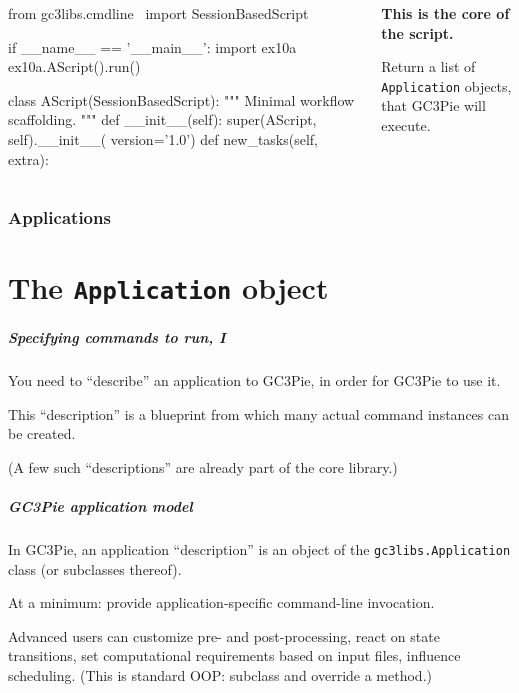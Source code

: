 \documentclass[english,serif,mathserif,xcolor=pdftex,dvipsnames,table]{beamer}
\begin{document}
\begin{frame}[fragile]
  \begin{columns}
    \begin{column}{0.7\linewidth}
\begin{python}
from gc3libs.cmdline \
  import SessionBasedScript

if __name__ == '__main__':
  import ex10a
  ex10a.AScript().run()

class AScript(SessionBasedScript):
  """
  Minimal workflow scaffolding.
  """
  def __init__(self):
    super(AScript, self).__init__(
        version='1.0')
  def new_tasks(self, extra):
    ~~
    ~~
\end{python}
    \end{column}
    \begin{column}{0.4\linewidth}
      \begin{flushright}
        \textbf{This is the core of the script.}

        \+
        Return a list of \texttt{Application} objects, that GC3Pie will execute.
      \end{flushright}
    \end{column}
  \end{columns}
\end{frame}


\section{Applications}
\part{The \texttt{Application} object}

\begin{frame}
  \frametitle{Specifying commands to run, I}

  You need to ``describe'' an application to GC3Pie, in order for
  GC3Pie to use it.

  \+
  This ``description'' is a blueprint from which many actual
  command instances can be created.

  \+
  (A few such ``descriptions'' are already part of the core library.)
\end{frame}


\begin{frame}
  \frametitle{GC3Pie application model}

  In GC3Pie, an application ``description'' is an object of the
  \texttt{gc3libs.Application} class (or subclasses thereof).

  \+
  At a minimum: provide application-specific command-line invocation.

  \+
  Advanced users can customize pre- and post-processing, react on
  state transitions, set computational requirements based on input
  files, influence scheduling.  (This is standard OOP: subclass and
  override a method.)
\end{frame}
\end{document}
